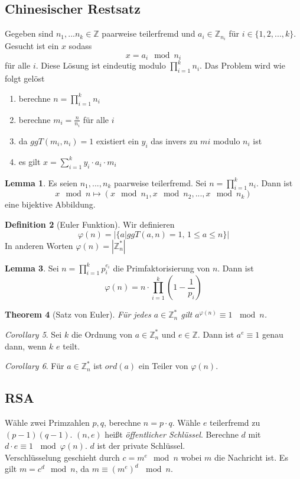 \documentclass[a4paper, 12pt]{article}
\theoremstyle{plain}
\newtheorem{theorem}{Theorem}[subsection] %
\theoremstyle{definition}
\newtheorem{definition}[theorem]{Definition} %
\theoremstyle{lemma}
\newtheorem{lemma}[theorem]{Lemma}
\theoremstyle{remark}
\theoremstyle{corollary}
\newtheorem{corollary}[theorem]{Corollary}
\theoremstyle{example}
\begin{document}
		\subsection{Chinesischer Restsatz}
	Gegeben sind $n_1,...n_k \in \mathbb{Z}$ paarweise teilerfremd und $a_i \in \mathbb{Z}_{n_i}$ für $i \in \{1,2,...,k\}$. Gesucht ist ein $x$ sodass \[x = a_i \mod n_i\] für alle $i$. Diese Lösung ist eindeutig modulo $\prod_{i=1}^{k} n_i$. Das Problem wird wie folgt gelöst \begin{enumerate}
		\item berechne $n = \prod_{i=1}^k n_i$
		\item berechne $m_i = \frac{n}{n_i}$ für alle $i$
		\item da $ggT(m_i,n_i) = 1$ existiert ein $y_i$ das invers zu $mi$ modulo $n_i$ ist
		\item es gilt $x = \sum_{i=1}^k y_i\cdot a_i \cdot m_i$
	\end{enumerate}
	\begin{lemma}
		Es seien $n_1,...,n_k$ paarweise teilerfremd. Sei $n = \prod_{i=1}^k n_i$. Dann ist \[x \mod n \mapsto (x \mod n_1, x \mod n_2, ..., x\mod n_k)\] eine bijektive Abbildung.
	\end{lemma}
	\begin{definition}[Euler Funktion]
		Wir definieren \[\varphi(n) = \left|\{a | ggT(a,n) = 1, \, 1 \leq a \leq n\}\right|\] In anderen Worten $\varphi(n) = \left|\mathbb{Z}_n^*\right|$
	\end{definition}
	\begin{lemma}
		Sei $n = \prod_{i=1}^k p_i^{e_i}$ die Primfaktorisierung von $n$. Dann ist \[\varphi(n) = n \cdot \prod_{i=1}^k \left(1-\frac{1}{p_i}\right)\]
	\end{lemma}
	\begin{theorem}[Satz von Euler]
		Für jedes $a\in\mathbb{Z}_n^*$ gilt $a^{\varphi(n)}\equiv 1 \, \mod n$.
	\end{theorem}
	\begin{corollary}
		Sei $k$ die Ordnung von $a\in\mathbb{Z}_n^*$ und $e\in\mathbb{Z}$. Dann ist $a^e\equiv 1$ genau dann, wenn $k$ $e$ teilt.
	\end{corollary}
	\begin{corollary}
		Für $a\in\mathbb{Z}_n^*$ ist $ord(a)$ ein Teiler von $\varphi(n)$.
	\end{corollary}
	\subsection{RSA}
	Wähle zwei Primzahlen $p,q$, berechne $n=p\cdot q$. Wähle $e$ teilerfremd zu $(p-1)(q-1)$. $(n,e)$ heißt \textit{öffentlicher Schlüssel}. Berechne $d$ mit $d\cdot e \equiv 1 \, \mod \varphi(n)$. $d$ ist der private Schlüssel.\\
	Verschlüsselung geschieht durch $c = m^e \mod n$ wobei $m$ die Nachricht ist. Es gilt $m = c^d \mod n$, da $m\equiv (m^e)^d \, \mod n$.
\end{document}
